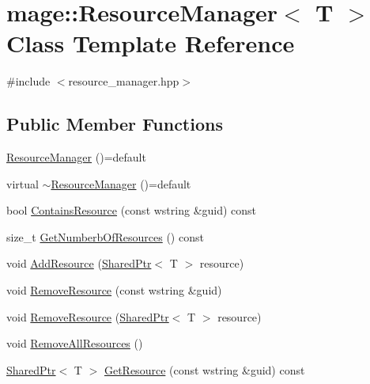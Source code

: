 \hypertarget{classmage_1_1_resource_manager}{}\section{mage\+:\+:Resource\+Manager$<$ T $>$ Class Template Reference}
\label{classmage_1_1_resource_manager}


{\ttfamily \#include $<$resource\+\_\+manager.\+hpp$>$}

\subsection*{Public Member Functions}
\begin{DoxyCompactItemize}
\item 
\hyperlink{classmage_1_1_resource_manager_aeb324963a4bb56a359535b49930cbe9d}{Resource\+Manager} ()=default
\item 
virtual \hyperlink{classmage_1_1_resource_manager_a60685932f6c5f40333cd1e072a6f8c81}{$\sim$\+Resource\+Manager} ()=default
\item 
bool \hyperlink{classmage_1_1_resource_manager_aa1af191388a63700e7ef203c5e4e84ca}{Contains\+Resource} (const wstring \&guid) const
\item 
size\+\_\+t \hyperlink{classmage_1_1_resource_manager_a1872b087dac1794746b320c6ece63fd8}{Get\+Numberb\+Of\+Resources} () const
\item 
void \hyperlink{classmage_1_1_resource_manager_a2f080e5351d7d9a5db939e457300c232}{Add\+Resource} (\hyperlink{namespacemage_a1e01ae66713838a7a67d30e44c67703e}{Shared\+Ptr}$<$ T $>$ resource)
\item 
void \hyperlink{classmage_1_1_resource_manager_acc3b157c8cc46fbe516a0802a5c26028}{Remove\+Resource} (const wstring \&guid)
\item 
void \hyperlink{classmage_1_1_resource_manager_ac557e5047590d0403291557c88966574}{Remove\+Resource} (\hyperlink{namespacemage_a1e01ae66713838a7a67d30e44c67703e}{Shared\+Ptr}$<$ T $>$ resource)
\item 
void \hyperlink{classmage_1_1_resource_manager_a25b8838bb73dfbc2c6589fae7da0099e}{Remove\+All\+Resources} ()
\item 
\hyperlink{namespacemage_a1e01ae66713838a7a67d30e44c67703e}{Shared\+Ptr}$<$ T $>$ \hyperlink{classmage_1_1_resource_manager_a3da61ed74b8ee7da513039fd8cadeffa}{Get\+Resource} (const wstring \&guid) const
\end{DoxyCompactItemize}
